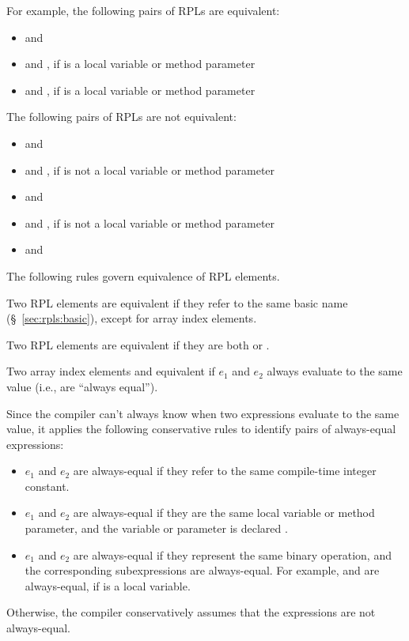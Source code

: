 For example, the following pairs of RPLs are equivalent:
%
\begin{itemize}
%
\item {} and 
%
\item {} and , if  is a 
  local variable or method parameter
%
\item {} and , if  is a
 local variable or method parameter
%
\end{itemize}
%
The following pairs of RPLs are not equivalent:
%
\begin{itemize}
%
\item {} and 
%
\item {} and , if  is not a
   local variable or method parameter
%
\item {} and 
%
\item {} and , if  is not a 
  local variable or method parameter
%
\item {} and 
%
\end{itemize}

 The following rules govern
equivalence of RPL elements.

 Two RPL elements
are equivalent if they refer to the same basic name
(\S~\ref{sec:rpls:basic}), except for array index elements.

 Two RPL elements are
equivalent if they are both \kwd{*} or \kwd{[?]}.

 Two array index elements \kwd{[$e_1$]}
and \kwd{[$e_2$]} equivalent if $e_1$ and $e_2$ always evaluate to the
same value (i.e., are ``always equal'').

Since the compiler can't always know when two expressions evaluate to
the same value, it applies the following conservative rules to
identify pairs of always-equal expressions:
%
\begin{itemize}
%
\item $e_1$ and $e_2$ are always-equal if they refer to the same
  compile-time integer constant.
%
\item $e_1$ and $e_2$ are always-equal if they are the same local
  variable or method parameter, and the variable or parameter is
  declared .
%
\item $e_1$ and $e_2$ are always-equal if they represent the same
  binary operation, and the corresponding subexpressions are
  always-equal.  For example,  and  are
  always-equal, if  is a  local variable.
\end{itemize}
%
Otherwise, the compiler conservatively assumes that the expressions
are not always-equal.


